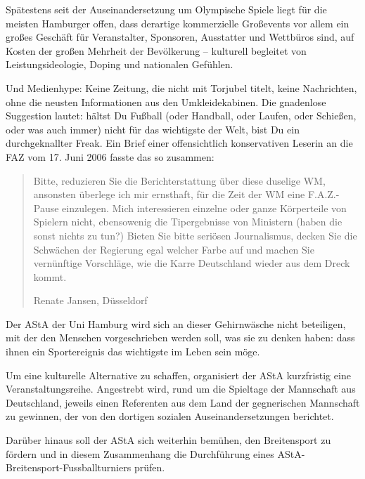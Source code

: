 \documentclass[ngerman,headheight=70pt]{scrartcl}
\begin{document}
    Spätestens seit der Auseinandersetzung um Olympische Spiele liegt für die
    meisten Hamburger offen, dass derartige kommerzielle Großevents vor allem
    ein großes Geschäft für Veranstalter, Sponsoren, Ausstatter und Wettbüros
    sind, auf Kosten der großen Mehrheit der Bevölkerung – kulturell begleitet
    von Leistungsideologie, Doping und nationalen Gefühlen.

    Und Medienhype: Keine Zeitung, die nicht mit Torjubel titelt, keine
    Nachrichten, ohne die neusten Informationen aus den Umkleidekabinen. Die
    gnadenlose Suggestion lautet: hältst Du Fußball (oder Handball, oder Laufen,
    oder Schießen, oder was auch immer) nicht für das wichtigste der Welt, bist
    Du ein durchgeknallter Freak. Ein Brief einer offensichtlich konservativen
    Leserin an die FAZ vom 17. Juni 2006 fasste das so zusammen:

    \blockquote[Renate Jansen, Düsseldorf]{Bitte, reduzieren Sie die Berichterstattung über diese duselige WM, ansonsten
    überlege ich mir ernsthaft, für die Zeit der WM eine F.A.Z.-Pause einzulegen.
    Mich interessieren einzelne oder ganze Körperteile von Spielern nicht,
    ebensowenig die Tipergebnisse von Ministern (haben die sonst nichts zu tun?)
    Bieten Sie bitte seriösen Journalismus, decken Sie die Schwächen der Regierung
    egal welcher Farbe auf und machen Sie vernünftige Vorschläge, wie die Karre
    Deutschland wieder aus dem Dreck kommt.}

    Der AStA der Uni Hamburg wird sich an dieser Gehirnwäsche nicht beteiligen,
    mit der den Menschen vorgeschrieben werden soll, was sie zu denken haben:
    dass ihnen ein Sportereignis das wichtigste im Leben sein möge.

    Um eine kulturelle Alternative zu schaffen, organisiert der AStA kurzfristig
    eine Veranstaltungsreihe. Angestrebt wird, rund um die Spieltage der
    Mannschaft aus Deutschland, jeweils einen Referenten aus dem Land der
    gegnerischen Mannschaft zu gewinnen, der von den dortigen sozialen
    Auseinandersetzungen berichtet.

    Darüber hinaus soll der AStA sich weiterhin bemühen, den Breitensport zu
    fördern und in diesem Zusammenhang die Durchführung eines
    AStA-Breitensport-Fussballturniers prüfen.
\end{document}
